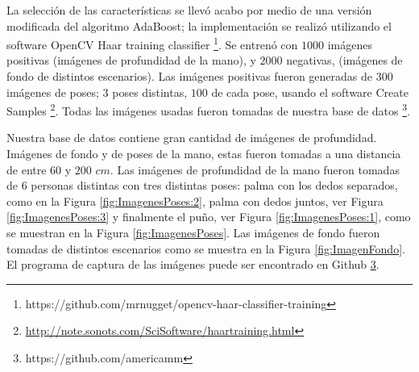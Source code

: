 La selección de las características se llev\'o acabo por medio de una versión modificada del algoritmo AdaBoost; la implementaci\'on se realiz\'o utilizando el software OpenCV Haar training classifier \footnote{{https://github.com/mrnugget/opencv-haar-classifier-training}}. Se entren\'o con $1000$ imágenes positivas (imágenes de profundidad de la mano), y $2000$ negativas, (imágenes de fondo de distintos escenarios). Las imágenes positivas fueron generadas de $300$ imágenes de poses; $3$ poses distintas, $100$ de cada pose, usando el software Create Samples \footnote{\url{http://note.sonots.com/SciSoftware/haartraining.html}}. Todas las imágenes usadas fueron tomadas de nuestra base de  datos \footnote{\label{myrepo} https://github.com/americamm}.

Nuestra base de datos contiene gran cantidad de imágenes de profundidad. Imágenes de fondo y de poses de la mano, estas fueron tomadas a una distancia de entre $60$ y $200$ $cm$. Las imágenes de profundidad de la mano fueron tomadas de $6$ personas distintas con tres distintas poses: palma con los dedos separados, como en la Figura \ref{fig:ImagenesPoses:2}, palma con dedos juntos, ver Figura \ref{fig:ImagenesPoses:3} y finalmente el pu\~no, ver Figura \ref{fig:ImagenesPoses:1}, como se muestran en la Figura \ref{fig:ImagenesPoses}. Las imágenes de fondo fueron tomadas de distintos escenarios como se muestra en la Figura \ref{fig:ImagenFondo}. El programa de captura de las imágenes puede ser encontrado en Github \ref{myrepo}.  

